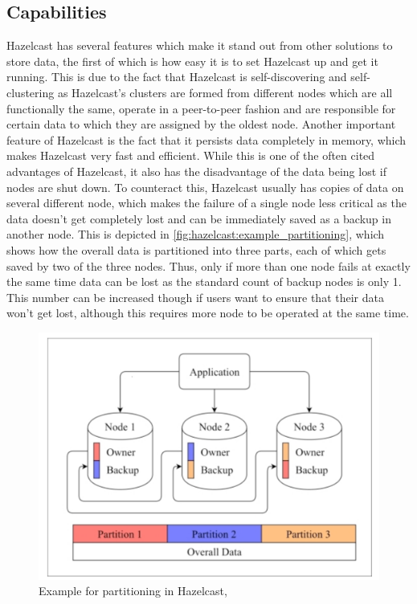 \subsection{Capabilities} \label{subsec:capabilitiesHazelcast}
Hazelcast has several features which make it stand out from other solutions to store data, the first of which is how easy it is 
to set Hazelcast up and get it running. This is due to the fact that Hazelcast is self-discovering and self-clustering as Hazelcast's 
clusters are formed from different nodes which are all functionally the same, operate in a peer-to-peer fashion and are responsible for 
certain data to which they are assigned by the oldest node\parencite{Johns.2015}. \newline
Another important feature of Hazelcast is the fact that it persists data completely in memory, which makes Hazelcast very fast and efficient.
While this is one of the often cited advantages of Hazelcast, it also has the disadvantage of the data being lost if nodes are shut down. To counteract this, Hazelcast usually has copies of data on several different node, which makes the failure of a single node less critical as the data doesn't get completely lost and can be immediately saved as a backup 
in another node. This is depicted in \autoref{fig:hazelcast:example_partitioning}, which shows how the overall data is partitioned into three parts, each of which gets saved by two of the three nodes. Thus, only if more than 
one node fails at exactly the same time data can be lost as the standard count of backup nodes is only 1. This number can be increased though if users want to 
ensure that their data won't get lost, although this requires more node to be operated at the same time\parencite{Johns.2015}. \newline

\begin{figure}[H]
    \centering
    \includegraphics[width=16cm]{images/hazelcast_partitioning.png}
    \caption[Example for partitioning in Hazelcast]{Example for partitioning in Hazelcast, \parencite{Johns.2015}}
    \label{fig:hazelcast:example_partitioning}
\end{figure}

